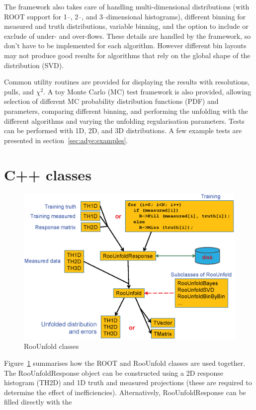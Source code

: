 \documentclass{desyproc}
\begin{document}
The framework also takes care of handling multi-dimensional distributions
(with ROOT support for 1--, 2--, and 3--dimensional histograms),
different binning for measured and truth distributions,
variable binning, and the option to include or exclude of under- and over-flows.
These details are handled by the framework, so don't have to be
implemented for each algorithm. However different bin layouts may not produce good results for
algorithms that rely on the global shape of the distribution (SVD).

Common utility routines are provided for displaying the results with resolutions,
pulls, and $\chi^2$. A toy Monte Carlo (MC) test framework is also provided, allowing
selection of different MC probability distribution functions (PDF) and parameters,
comparing different binning, and performing the unfolding with the different
algorithms and varying the unfolding regularisation parameters.
Tests can be performed with 1D, 2D, and 3D distributions.
A few example tests are presented in section~\ref{sec:adye:examples}.



\section{C++ classes}

\begin{figure}[hb]
\centerline{\includegraphics[width=\textwidth]{adye_tim.classes.eps}}
\caption{RooUnfold classes}\label{Fig:adye:classes}
\end{figure}

Figure~\ref{Fig:adye:classes} summarises how the ROOT and RooUnfold classes are used
together. The RooUnfoldResponse object can be constructed using a 2D response histogram (TH2D)
and 1D truth and measured projections (these are required to determine the effect of inefficiencies).
Alternatively, RooUnfoldResponse can be filled directly with the
\end{document}

